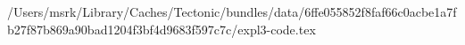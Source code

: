 /Users/msrk/Library/Caches/Tectonic/bundles/data/6ffe055852f8faf66c0acbe1a7fb27f87b869a90bad1204f3bf4d9683f597c7c/expl3-code.tex